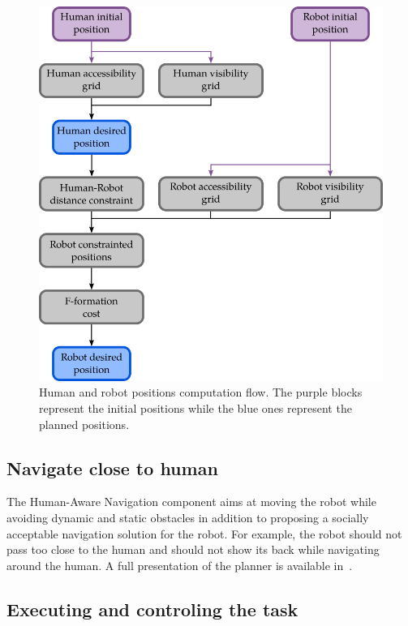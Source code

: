 \begin{figure}[ht!]
\centering
\includegraphics[scale=0.44]{figures/chapter8/svp.png}
\caption{\label{fig:chap8_svp} Human and robot positions computation flow. The purple blocks represent the initial positions while the blue ones represent the planned positions. }
\end{figure}

\subsection{Navigate close to human}

The Human-Aware Navigation component aims at moving the robot while avoiding dynamic and static obstacles in addition to proposing a socially acceptable navigation solution for the robot. For example, the robot should not pass too close to the human and should not show its back while navigating around the human. A full presentation of the planner is available in~\cite{singamaneni_2020_hateb}.

\subsection{Executing and controling the task}


